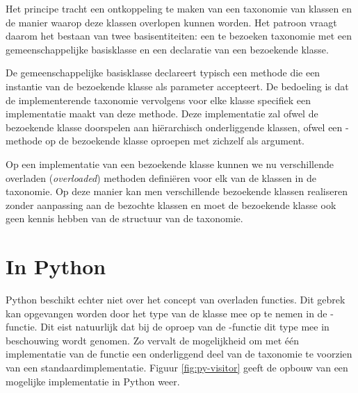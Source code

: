 Het principe tracht een ontkoppeling te maken van een taxonomie van klassen en
de manier waarop deze klassen overlopen kunnen worden. Het patroon vraagt
daarom het bestaan van twee basisentiteiten: een te bezoeken taxonomie met een
gemeenschappelijke basisklasse en een declaratie van een bezoekende klasse.

De gemeenschappelijke basisklasse declareert typisch een methode 
die een instantie van de bezoekende klasse als parameter accepteert. De
bedoeling is dat de implementerende taxonomie vervolgens voor elke klasse
specifiek een implementatie maakt van deze methode. Deze implementatie zal
ofwel de bezoekende klasse doorspelen aan hi\"erarchisch onderliggende klassen,
ofwel een -methode op de bezoekende klasse oproepen met zichzelf als
argument.

Op een implementatie van een bezoekende klasse kunnen we nu verschillende
overladen (\emph{overloaded}) methoden defini\"eren voor elk van de klassen in
de taxonomie. Op deze manier kan men verschillende bezoekende klassen
realiseren zonder aanpassing aan de bezochte klassen en moet de bezoekende
klasse ook geen kennis hebben van de structuur van de taxonomie.

\section{In Python}

Python beschikt echter niet over het concept van overladen functies. Dit gebrek
kan opgevangen worden door het type van de klasse mee op te nemen in de
-functie. Dit eist natuurlijk dat bij de oproep van de
-functie dit type mee in beschouwing wordt genomen. Zo
vervalt de mogelijkheid om met \'e\'en implementatie van de functie een
onderliggend deel van de taxonomie te voorzien van een standaardimplementatie.
Figuur \ref{fig:py-visitor} geeft de opbouw van een mogelijke implementatie in
Python weer.


